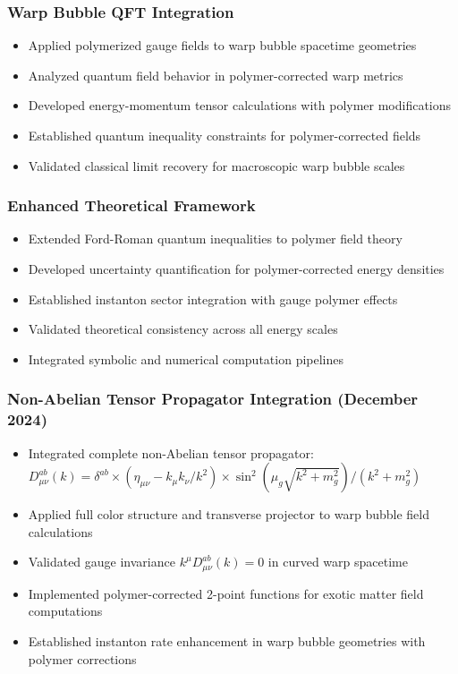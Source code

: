 \documentclass[11pt]{article}
\begin{document}
\subsubsection{Warp Bubble QFT Integration}
\begin{itemize}
    \item Applied polymerized gauge fields to warp bubble spacetime geometries
    \item Analyzed quantum field behavior in polymer-corrected warp metrics
    \item Developed energy-momentum tensor calculations with polymer modifications
    \item Established quantum inequality constraints for polymer-corrected fields
    \item Validated classical limit recovery for macroscopic warp bubble scales
\end{itemize}

\subsubsection{Enhanced Theoretical Framework}
\begin{itemize}
    \item Extended Ford-Roman quantum inequalities to polymer field theory
    \item Developed uncertainty quantification for polymer-corrected energy densities
    \item Established instanton sector integration with gauge polymer effects
    \item Validated theoretical consistency across all energy scales
    \item Integrated symbolic and numerical computation pipelines
\end{itemize}

\subsubsection{Non-Abelian Tensor Propagator Integration (December 2024)}
\begin{itemize}
    \item Integrated complete non-Abelian tensor propagator: $D^{ab}_{\mu\nu}(k) = \delta^{ab} \times (\eta_{\mu\nu} - k_\mu k_\nu/k^2) \times \sin^2(\mu_g\sqrt{k^2 + m_g^2})/(k^2 + m_g^2)$
    \item Applied full color structure and transverse projector to warp bubble field calculations
    \item Validated gauge invariance $k^\mu D^{ab}_{\mu\nu}(k) = 0$ in curved warp spacetime
    \item Implemented polymer-corrected 2-point functions for exotic matter field computations
    \item Established instanton rate enhancement in warp bubble geometries with polymer corrections
\end{itemize}
\end{document}
